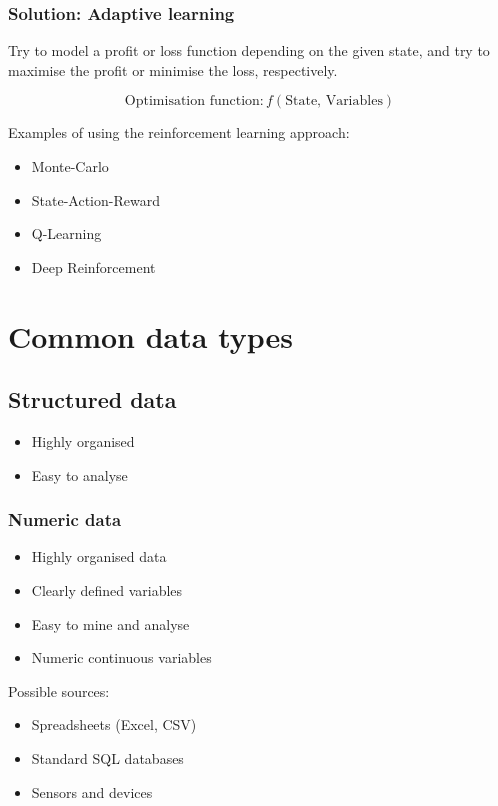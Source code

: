 \documentclass[11pt]{article}
\begin{document}
\subsubsection{Solution: Adaptive learning}
\label{sec:orge635b34}
Try to model a profit or loss function depending on the given state, and try to maximise the profit or minimise the loss, respectively.

\[\text{Optimisation function}: f(\text{State, Variables})\]

Examples of using the reinforcement learning approach:
\begin{itemize}
\item Monte-Carlo
\item State-Action-Reward
\item Q-Learning
\item Deep Reinforcement
\end{itemize}

 \newpage
\section{Common data types}
\label{sec:org34adc71}

\subsection{Structured data}
\label{sec:org08329ae}
\begin{itemize}
\item Highly organised
\item Easy to analyse
\end{itemize}
\subsubsection{Numeric data}
\label{sec:org33c7e71}
\begin{itemize}
\item Highly organised data
\item Clearly defined variables
\item Easy to mine and analyse
\item Numeric continuous variables
\end{itemize}

Possible sources:
\begin{itemize}
\item Spreadsheets (Excel, CSV)
\item Standard SQL databases
\item Sensors and devices
\end{itemize}
\end{document}
